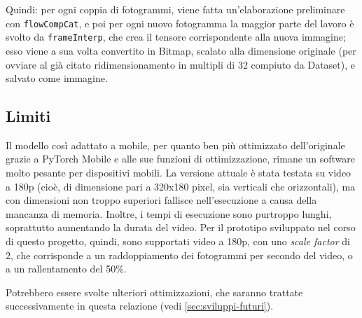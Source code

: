 Quindi: per ogni coppia di fotogrammi, viene fatta un'elaborazione preliminare con
\texttt{flowCompCat}, e poi per ogni nuovo fotogramma la maggior parte del lavoro è svolto da
\texttt{frameInterp}, che crea il tensore corrispondente alla nuova immagine; esso viene a sua
volta convertito in Bitmap, scalato alla dimensione originale (per ovviare al già 
citato ridimensionamento in multipli di 32 compiuto da Dataset), e salvato come immagine.

\subsection{Limiti}

Il modello così adattato a mobile, per quanto ben più ottimizzato dell'originale grazie a
PyTorch Mobile e alle sue funzioni di ottimizzazione, rimane un software molto pesante per
dispositivi mobili. La versione attuale è stata testata su video a 180p (cioè, di dimensione
pari a 320x180 pixel, sia verticali che orizzontali), ma con dimensioni non troppo superiori
fallisce nell'esecuzione a causa della mancanza di memoria. Inoltre, i tempi di esecuzione
sono purtroppo lunghi, soprattutto aumentando la durata del video. Per il prototipo sviluppato 
nel corso di questo progetto, quindi, sono supportati video a 180p, con uno \emph{scale factor} 
di 2, che corrisponde a un raddoppiamento dei fotogrammi per secondo del video, o a un
rallentamento del 50\%.

Potrebbero essere svolte ulteriori ottimizzazioni, che saranno trattate successivamente 
in questa relazione (vedi \ref{sec:sviluppi-futuri}).
